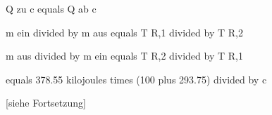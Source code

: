 Q zu c equals Q ab c

m ein divided by m aus equals T R,1 divided by T R,2

m aus divided by m ein equals T R,2 divided by T R,1

equals 378.55 kilojoules times (100 plus 293.75) divided by c

[siehe Fortsetzung]